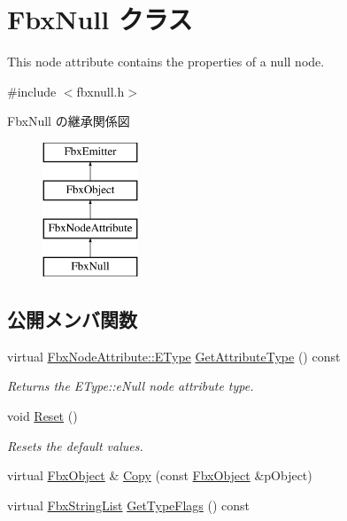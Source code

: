 \hypertarget{class_fbx_null}{}\section{Fbx\+Null クラス}
\label{class_fbx_null}


This node attribute contains the properties of a null node.  




{\ttfamily \#include $<$fbxnull.\+h$>$}

Fbx\+Null の継承関係図\begin{figure}[H]
\begin{center}
\leavevmode
\includegraphics[height=4.000000cm]{class_fbx_null}
\end{center}
\end{figure}
\subsection*{公開メンバ関数}
\begin{DoxyCompactItemize}
\item 
virtual \hyperlink{class_fbx_node_attribute_a08e1669d3d1a696910756ab17de56d6a}{Fbx\+Node\+Attribute\+::\+E\+Type} \hyperlink{class_fbx_null_a16b32e758ed2fe821e2c895526b71925}{Get\+Attribute\+Type} () const
\begin{DoxyCompactList}\small\item\em Returns the E\+Type\+::e\+Null node attribute type. \end{DoxyCompactList}\item 
void \hyperlink{class_fbx_null_add3bbcdc43864c3e8341c31e1cc68ec9}{Reset} ()
\begin{DoxyCompactList}\small\item\em Resets the default values. \end{DoxyCompactList}\item 
virtual \hyperlink{class_fbx_object}{Fbx\+Object} \& \hyperlink{class_fbx_null_a9427b6a7357d3c8adfc80279bc1db003}{Copy} (const \hyperlink{class_fbx_object}{Fbx\+Object} \&p\+Object)
\item 
virtual \hyperlink{class_fbx_string_list}{Fbx\+String\+List} \hyperlink{class_fbx_null_a48d35f4f24364e439f0d8a8e07c6d98f}{Get\+Type\+Flags} () const
\end{DoxyCompactItemize}
